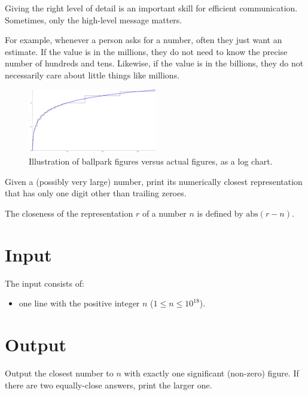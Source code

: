 
Giving the right level of detail is an important skill for efficient
communication. Sometimes, only the high-level message matters.

For example, whenever a person asks for a number, often they just want an
estimate.  If the value is in the millions, they do not need to know the
precise number of hundreds and tens.
Likewise, if the value is in the billions, they do not necessarily care about
little things like millions.

\begin{figure}[h!]
  \centering
  \includegraphics[width=0.5\textwidth]{chart}
  \caption{Illustration of ballpark figures versus actual figures, as a log chart.}
  \label{fig:ballpark}
\end{figure}

Given a (possibly very large) number, print its numerically closest
representation that has only one digit other than trailing zeroes.

The closeness of the representation $r$ of a number $n$ is defined by
$\text{abs}(r - n)$.

\section*{Input}

The input consists of:
\begin{itemize}
  \item one line with the positive integer $n$ ($1 \le n \le 10^{18}$).
\end{itemize}

\section*{Output}

Output the closest number to $n$ with exactly one significant (non-zero) figure.
If there are two equally-close answers, print the larger one.
